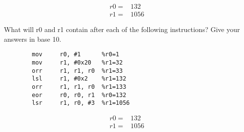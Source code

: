 \documentclass[12pt]{article}
\newenvironment{solution}[2][Solution]{\begin{trivlist}
\item[\hskip \labelsep {\bfseries #1}]}{\end{trivlist}}
\newenvironment{problem}[2][Problem]{\begin{trivlist}
\item[\hskip \labelsep {\bfseries #1}\hskip \labelsep {\bfseries #2.}]}{\end{trivlist}}
\begin{document}
\begin{solution}{}
    \begin{align*}
        r0 = & 132 \\
        r1 = & 1056
    \end{align*}
\end{solution}


\begin{problem}{4.2}
    What will r0 and r1 contain after each of the following instructions? Give your answers in base 10.
    \begin{verbatim}
        mov     r0, #1      %r0=1
        mov     r1, #0x20   %r1=32
        orr     r1, r1, r0  %r1=33
        lsl     r1, #0x2    %r1=132
        orr     r1, r1, r0  %r1=133
        eor     r0, r0, r1  %r0=132
        lsr     r1, r0, #3  %r1=1056
    \end{verbatim}

\end{problem}

\begin{solution}{}
    \begin{align*}
        r0 = & 132 \\
        r1 = & 1056
    \end{align*}
\end{solution}
\end{document}
